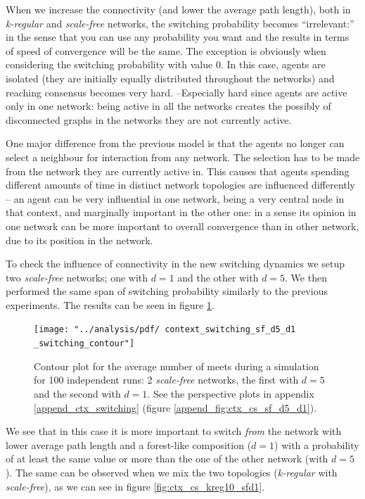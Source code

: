 \documentclass[preprint,number]{elsarticle}
\begin{document}
When we increase the connectivity (and lower the average path length), both in \textit{k-regular} and \textit{scale-free} networks, the switching probability becomes ``irrelevant:'' in the sense that you can use any probability you want and the results in terms of speed of convergence will be the same. The exception is obviously when considering the switching probability with value $0$. In this case, agents are isolated (they are initially equally distributed throughout the networks) and reaching consensus becomes very hard. --Especially hard since agents are active only in one network: being active in all the networks creates the possibly of disconnected graphs in the networks they are not currently active.

One major difference from the previous model is that the agents no longer can select a neighbour for interaction from any network. The selection has to be made from the network they are currently active in. This causes that agents spending different amounts of time in distinct network topologies are influenced differently -- an agent can be very influential in one network, being a very central node in that context, and marginally important in the other one: in a sense its opinion in one network can be more important to overall convergence than in other network,  due to its position in the network.

To check the influence of connectivity in the new switching dynamics we setup two \textit{scale-free} networks; one with $d=1$ and the other with $d=5$. We then performed the 
same span of switching probability similarly to the previous experiments. The results can be seen in figure \ref{fig:ctx_cs_sf_d5_d1}.

\begin{figure}[H]
	\centering
	\texttt{[image: "../analysis/pdf/ context\_switching\_sf\_d5\_d1 \_switching\_contour"]}
	\begin{minipage}{0.9\textwidth}
		\caption{Contour plot for the average number of meets during a simulation for 100 independent runs: 2 \textit{scale-free} networks, the first with $d=5$ and the second with $d=1$. See the perspective plots in  appendix \ref{append_ctx_switching} (figure \ref{append_fig:ctx_cs_sf_d5_d1}).
		}
		\label{fig:ctx_cs_sf_d5_d1}
	\end{minipage}
\end{figure}

We see that in this case it is more important to switch \textit{from} the network with lower average path length and a forest-like composition ($d=1$) with a probability of at least the same value or more than the one of the other network (with $d=5$). The same can be observed when we mix the two topologies (\textit{k-regular} with \textit{scale-free}), as we can see in figure \ref{fig:ctx_cs_kreg10_sfd1}.
\end{document}
